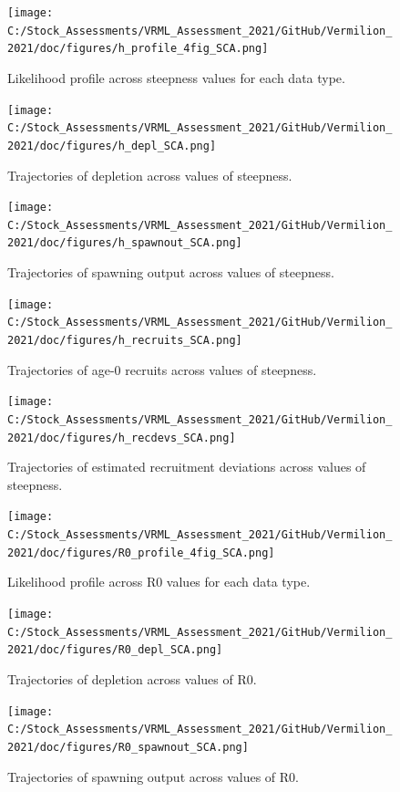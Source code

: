 \documentclass[11pt,
  english,
]{article}
\begin{document}
\begin{figure}
\centering
\texttt{[image: C:/Stock\_Assessments/VRML\_Assessment\_2021/GitHub/Vermilion\_2021/doc/figures/h\_profile\_4fig\_SCA.png]}
\caption{Likelihood profile across steepness values for each data type.\label{fig:h-profile}}
\end{figure}

\begin{figure}
\centering
\texttt{[image: C:/Stock\_Assessments/VRML\_Assessment\_2021/GitHub/Vermilion\_2021/doc/figures/h\_depl\_SCA.png]}
\caption{Trajectories of depletion across values of steepness.\label{fig:h-depl}}
\end{figure}

\begin{figure}
\centering
\texttt{[image: C:/Stock\_Assessments/VRML\_Assessment\_2021/GitHub/Vermilion\_2021/doc/figures/h\_spawnout\_SCA.png]}
\caption{Trajectories of spawning output across values of steepness.\label{fig:h-spawn}}
\end{figure}

\begin{figure}
\centering
\texttt{[image: C:/Stock\_Assessments/VRML\_Assessment\_2021/GitHub/Vermilion\_2021/doc/figures/h\_recruits\_SCA.png]}
\caption{Trajectories of age-0 recruits across values of steepness.\label{fig:h-recruits}}
\end{figure}

\begin{figure}
\centering
\texttt{[image: C:/Stock\_Assessments/VRML\_Assessment\_2021/GitHub/Vermilion\_2021/doc/figures/h\_recdevs\_SCA.png]}
\caption{Trajectories of estimated recruitment deviations across values of steepness.\label{fig:h-recdevs}}
\end{figure}

\begin{figure}
\centering
\texttt{[image: C:/Stock\_Assessments/VRML\_Assessment\_2021/GitHub/Vermilion\_2021/doc/figures/R0\_profile\_4fig\_SCA.png]}
\caption{Likelihood profile across R0 values for each data type.\label{fig:r0-profile}}
\end{figure}

\begin{figure}
\centering
\texttt{[image: C:/Stock\_Assessments/VRML\_Assessment\_2021/GitHub/Vermilion\_2021/doc/figures/R0\_depl\_SCA.png]}
\caption{Trajectories of depletion across values of R0.\label{fig:r0-depl}}
\end{figure}

\begin{figure}
\centering
\texttt{[image: C:/Stock\_Assessments/VRML\_Assessment\_2021/GitHub/Vermilion\_2021/doc/figures/R0\_spawnout\_SCA.png]}
\caption{Trajectories of spawning output across values of R0.\label{fig:r0-spawn}}
\end{figure}
\end{document}
